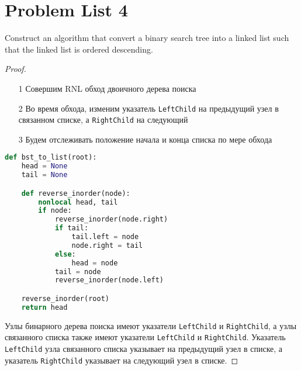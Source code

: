 \section{Problem List 4}

\begin{prob}
Construct an algorithm that convert a binary search tree into a linked list such that the linked list is ordered descending.
\end{prob}
\vskip 0.2in
\begin{proof}
\begin{itemize}
    \item[] 
    \item[1] Совершим RNL обход двоичного дерева поиска
    \item[2] Во время обхода, изменим указатель \texttt{LeftChild} на предыдущий узел в связанном списке, а \texttt{RightChild} на следующий
    \item[3] Будем отслеживать положение начала и конца списка по мере обхода
\end{itemize}

\begin{lstlisting}[language=Python]
def bst_to_list(root):
    head = None
    tail = None

    def reverse_inorder(node):
        nonlocal head, tail
        if node:
            reverse_inorder(node.right)
            if tail:
                tail.left = node
                node.right = tail
            else:
                head = node
            tail = node
            reverse_inorder(node.left)

    reverse_inorder(root)
    return head
\end{lstlisting}

Узлы бинарного дерева поиска имеют указатели \texttt{LeftChild} и \texttt{RightChild}, а узлы связанного списка также имеют указатели \texttt{LeftChild} и \texttt{RightChild}. Указатель \texttt{LeftChild} узла связанного списка указывает на предыдущий узел в списке, а указатель \texttt{RightChild} указывает на следующий узел в списке.
\end{proof}
\vskip 0.6in



